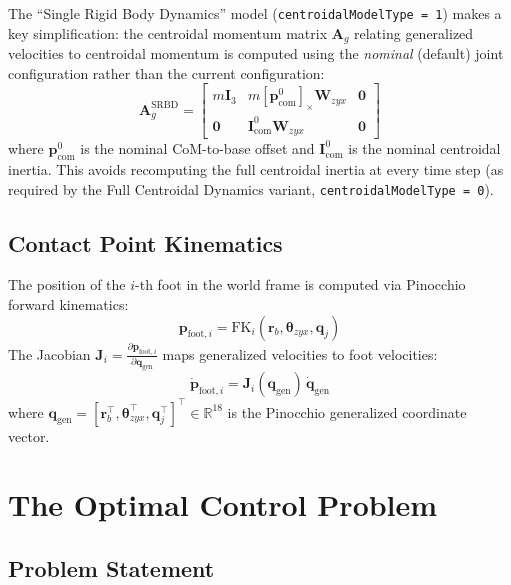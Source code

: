 \documentclass[11pt,a4paper]{article}
\newcommand{\R}{\mathbb{R}}==
\newcommand{\skewmat}[1]{\left[ #1 \right]_\times}
\begin{document}
The ``Single Rigid Body Dynamics'' model (\texttt{centroidalModelType = 1}) makes a key simplification: the centroidal momentum matrix $\bm{A}_g$ relating generalized velocities to centroidal momentum is computed using the \emph{nominal} (default) joint configuration rather than the current configuration:
\begin{equation}
	\bm{A}_g^{\text{SRBD}} = \begin{bmatrix}
		m\bm{I}_3 & m\skewmat{\bm{p}_{\text{com}}^0}\bm{W}_{zyx} & \bm{0} \\
		\bm{0}    & \bm{I}_{\text{com}}^0 \bm{W}_{zyx}           & \bm{0}
	\end{bmatrix}
\end{equation}
where $\bm{p}_{\text{com}}^0$ is the nominal CoM-to-base offset and $\bm{I}_{\text{com}}^0$ is the nominal centroidal inertia. This avoids recomputing the full centroidal inertia at every time step (as required by the Full Centroidal Dynamics variant, \texttt{centroidalModelType = 0}).

\subsection{Contact Point Kinematics}

The position of the $i$-th foot in the world frame is computed via Pinocchio forward kinematics:
\begin{equation}
	\bm{p}_{\text{foot},i} = \text{FK}_i(\bm{r}_b, \bm{\theta}_{zyx}, \bm{q}_j)
\end{equation}
The Jacobian $\bm{J}_i = \frac{\partial \bm{p}_{\text{foot},i}}{\partial \bm{q}_{\text{gen}}}$ maps generalized velocities to foot velocities:
\begin{equation}
	\dot{\bm{p}}_{\text{foot},i} = \bm{J}_i(\bm{q}_{\text{gen}})\, \dot{\bm{q}}_{\text{gen}}
\end{equation}
where $\bm{q}_{\text{gen}} = [\bm{r}_b^\top, \bm{\theta}_{zyx}^\top, \bm{q}_j^\top]^\top \in \R^{18}$ is the Pinocchio generalized coordinate vector.


\section{The Optimal Control Problem}
\label{sec:ocp}

\subsection{Problem Statement}
\end{document}
